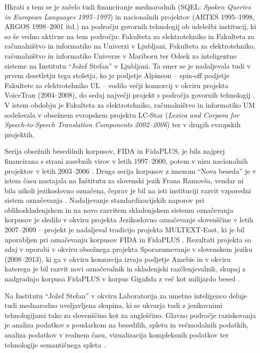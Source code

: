 \begin{multicols}{2}
Hkrati s tem se je začelo tudi financiranje mednarodnih (SQEL: \textit{Spoken Queries in European Languages 1995--1997}) in nacionalnih projektov (ARTES 1995--1998, ARGOS 1998--2001 itd.) na področju go\-vor\-nih tehnologij ob udeležbi institucij, ki so še vedno aktivne na tem področju: Fakulteta za elektrotehniko in Fakulteta za računalništvo in informatiko na Univerzi v Ljub\-ljani, Fakulteta za elektrotehniko, računalništvo in informatiko Univerze v Mariboru ter Odsek za inteligentne sisteme na Institutu “Jožef Stefan” v Ljub\-ljani. Ta smer se je nadaljevala tudi v prvem desetletju tega stoletja, ko je podjetje Alpineon – spin-off podjetje Fakultete za elektrotehniko UL – vodilo večji konzorcij v okviru projekta VoiceTran (2004--2008), do sedaj naj\-večji projekt s področja go\-vornih tehnologij \cite{Alp2}. V istem obdobju je Fakulteta za elektrotehniko, računalništvo in informatiko UM sodelovala v obsežnem evropskem projektu LC-Star (\textit{Lexica and Corpora for Speech-to-Speech Translation Components 2002--2006}) ter v drugih evropskih projektih.


Serija obsežnih besedilnih korpusov, FIDA in FidaPLUS, je bila naj\-prej financirana s strani zasebnih virov v letih 1997--2000, potem v nizu nacionalnih projektov v letih 2003--2006 \cite{Fida1}. Druga serija korpusov z imenom “Nova beseda” je v istem času nastajala na Inštitutu za slovenski jezik Frana Ramovša, vendar ni bila nikoli jezikoslovno označena, čeprav je bil na isti instituciji razvit vzporedni sistem označevanja \cite{NB1}.  Nadaljevanje standardizacij\-skih naporov pri oblikoskladenjskem in na novo razvitem skladenjskem sistemu označevanja korpusov je sledilo v okviru projekta Jezikoslovno označevanje slovenščine v letih 2007--2009 – projekt je nadaljeval tradicijo projekta MULTEXT-East, ki je bil uporab\-ljen pri označevanju korpusov FIDA in FidaPLUS \cite{JOS1}. Rezultati projekta so zdaj v uporabi v okviru obsežnega projekta Sporazumevanje v slovenskem jeziku (2008--2013), ki ga v okviru konzorcija izvaja podjetje Amebis in v okviru katerega je bil razvit novi označevalnik in skladenjski razčlenjevalnik, skupaj z nadgradnjo korpusa FidaPLUS v korpus Gigafida z več kot mili\-jardo besed \cite{Slo1}. 
	
Na Institutu “Jožef Stefan” v okviru Laboratorija za umetno inteligenco deluje tudi mednarodno uveljav\-ljena skupina, ki se ukvarja tudi z jezikov\-nimi tehnologijami tako za slovenščino kot za angleščino. Glavno področje raziskovanja je ana\-liza podatkov s poudarkom na besedilih, spletu in večmodalnih podatkih, analiza podatkov v realnem času, vizualizacija kompleksnih podatkov ter tehnologije semantičnega spleta \cite{Ailab1}. 


\end{multicols}
